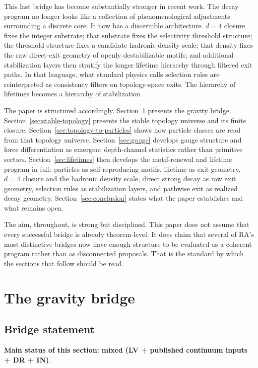 \documentclass[11pt]{article}
\begin{document}
This last bridge has become substantially stronger in recent work. The decay program no longer looks like a collection of phenomenological adjustments surrounding a discrete core. It now has a discernible architecture. $d=4$ closure fixes the integer substrate; that substrate fixes the selectivity threshold structure; the threshold structure fixes a candidate hadronic density scale; that density fixes the raw direct-exit geometry of openly destabilizable motifs; and additional stabilization layers then stratify the longer lifetime hierarchy through filtered exit paths. In that language, what standard physics calls selection rules are reinterpreted as consistency filters on topology-space exits. The hierarchy of lifetimes becomes a hierarchy of stabilization.

The paper is structured accordingly. Section~\ref{sec:gravity} presents the gravity bridge. Section~\ref{sec:stable-topology} presents the stable topology universe and its finite closure. Section~\ref{sec:topology-to-particles} shows how particle classes are read from that topology universe. Section~\ref{sec:gauge} develops gauge structure and force differentiation as emergent depth-channel statistics rather than primitive sectors. Section~\ref{sec:lifetimes} then develops the motif-renewal and lifetime program in full: particles as self-reproducing motifs, lifetime as exit geometry, $d=4$ closure and the hadronic density scale, direct strong decay as raw exit geometry, selection rules as stabilization layers, and pathwise exit as realized decay geometry. Section~\ref{sec:conclusion} states what the paper establishes and what remains open.

The aim, throughout, is strong but disciplined. This paper does not assume that every successful bridge is already theorem-level. It does claim that several of RA's most distinctive bridges now have enough structure to be evaluated as a coherent program rather than as disconnected proposals. That is the standard by which the sections that follow should be read.

\section{The gravity bridge}\label{sec:gravity}
\subsection{Bridge statement}
\textbf{Main status of this section:} \textbf{mixed (LV + published continuum inputs + DR + IN)}.
\end{document}
